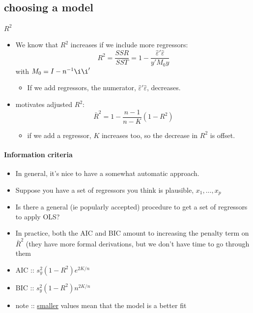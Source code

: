 \subsection{choosing a model}

\paragraph{$R^{2}$}
\begin{itemize}
\item We know that $R^{2}$ increases if we include more regressors:
        \[R^{2} = \frac{SSR}{SST} = 1 -
        \frac{\hat{\varepsilon}'\hat{\varepsilon}}{y'M_{0}y}\]
        with $M_{0} = I - n^{-1} \i \i'$
\begin{itemize}
\item If we add regressors, the numerator,
          $\hat{\varepsilon}'\hat{\varepsilon}$, decreases.
\end{itemize}
\item motivates adjusted $R^{2}$:
        \[ \bar{R}^{2} = 1 - \frac{n-1}{n-K}(1-R^{2})\]
\begin{itemize}
\item if we add a regressor, $K$ increases too, so the decrease in
          $R^{2}$ is offset.
\end{itemize}
\end{itemize}

\paragraph{Information criteria}
\begin{itemize}
\item In general, it's nice to have a somewhat automatic approach.
\item Suppose you have a set of regressors you think is plausible,
        $x_{1},\dots,x_{p}$
\item Is there a general (ie popularly accepted) procedure to get a
        set of regressors to apply OLS?
\item In practice, both the AIC and BIC amount to increasing the
        penalty term on $\bar{R}^{2}$ (they have more formal
        derivations, but we don't have time to go through them
\item AIC :: $s_{y}^{2} (1 - R^{2}) e^{2K/n}$
\item BIC :: $s_{y}^{2} (1 - R^{2}) n^{2K/n}$
\item note :: \underline{smaller} values mean that the model is a better fit
\end{itemize}

